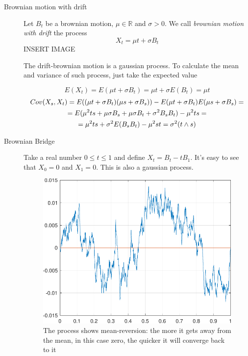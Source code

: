 \begin{description}
    \item[Brownian motion with drift] Let $B_t$ be a brownian motion, $\mu \in \mathbb{R}$ and $\sigma > 0$. We call \textit{brownian motion with drift} the process 
    \begin{equation}
        X_t = \mu t + \sigma B_t
    \end{equation}
    INSERT IMAGE

    The drift-brownian motion is a gaussian process. To calculate the mean and variance of such process, just take the expected value

    \begin{equation}
        E(X_t) = E(\mu t + \sigma B_t) = \mu t + \sigma E(B_t) = \mu t
    \end{equation}
    \begin{gather}
        Cov(X_s, X_t) = E((\mu t + \sigma B_t)(\mu s + \sigma B_s)) - E(\mu t + \sigma B_t) E(\mu s + \sigma B_s) = \notag \\
        = E(\mu^2 t s + \mu \sigma B_s + \mu \sigma B_t + \sigma^2 B_s B_t) - \mu^2 ts = \notag \\
        = \mu^2 ts + \sigma^2 E(B_s B_t) - \mu^2 st = \sigma^2 (t \wedge s)
    \end{gather}
    \item[Brownian Bridge] Take a real number $0 \leq t \leq 1$ and define $X_t = B_t - tB_1$. It's easy to see that $X_0 = 0$ and $X_1 = 0$. This is also a gaussian process.

    \begin{figure}[h!]
        \centering
        \includegraphics[width=0.5\linewidth]{assets/bridge.pdf}
        \caption{The process shows mean-reversion: the more it gets away from the mean, in this case zero, the quicker it will converge back to it}
        \label{fig:bridge}
    \end{figure}


\end{description}
